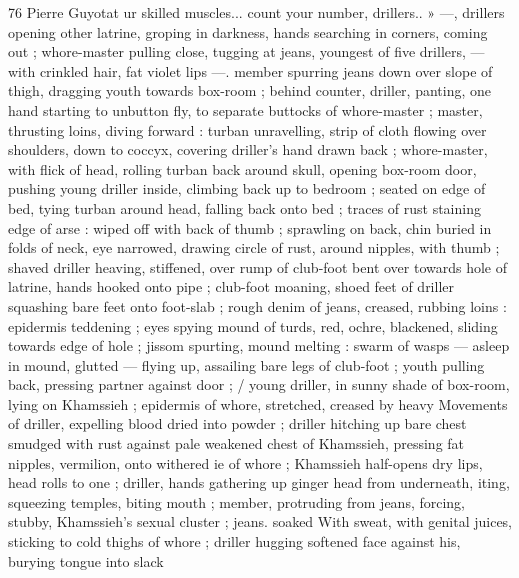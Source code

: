 76 Pierre Guyotat
ur skilled muscles... count your number, drillers.. » —, drillers
opening other latrine, groping in darkness, hands searching in
corners, coming out ; whore-master pulling close, tugging at jeans,
youngest of five drillers, — with crinkled hair, fat violet lips —.
member spurring jeans down over slope of thigh, dragging youth
towards box-room ; behind counter, driller, panting, one hand
starting to unbutton fly, to separate buttocks of whore-master ;
master, thrusting loins, diving forward : turban unravelling, strip of
cloth flowing over shoulders, down to coccyx, covering driller's hand
drawn back ; whore-master, with flick of head, rolling turban back
around skull, opening box-room door, pushing young driller inside,
climbing back up to bedroom ; seated on edge of bed, tying turban
around head, falling back onto bed ; traces of rust staining edge of
arse : wiped off with back of thumb ; sprawling on back, chin buried
in folds of neck, eye narrowed, drawing circle of rust, around
nipples, with thumb ; shaved driller heaving, stiffened, over rump of
club-foot bent over towards hole of latrine, hands hooked onto pipe
; club-foot moaning, shoed feet of driller squashing bare feet onto
foot-slab ; rough denim of jeans, creased, rubbing loins : epidermis
teddening ; eyes spying mound of turds, red, ochre, blackened,
sliding towards edge of hole ; jissom spurting, mound melting :
swarm of wasps — asleep in mound, glutted — flying up, assailing
bare legs of club-foot ; youth pulling back, pressing partner against
door ; / young driller, in sunny shade of box-room, lying on
Khamssieh ; epidermis of whore, stretched, creased by heavy
Movements of driller, expelling blood dried into powder ; driller
hitching up bare chest smudged with rust against pale weakened
chest of Khamssieh, pressing fat nipples, vermilion, onto withered
ie of whore ; Khamssieh half-opens dry lips, head rolls to one
; driller, hands gathering up ginger head from underneath,
iting, squeezing temples, biting mouth ; member, protruding from
jeans, forcing, stubby, Khamssieh’s sexual cluster ; jeans. soaked
With sweat, with genital juices, sticking to cold thighs of whore ;
driller hugging softened face against his, burying tongue into slack


